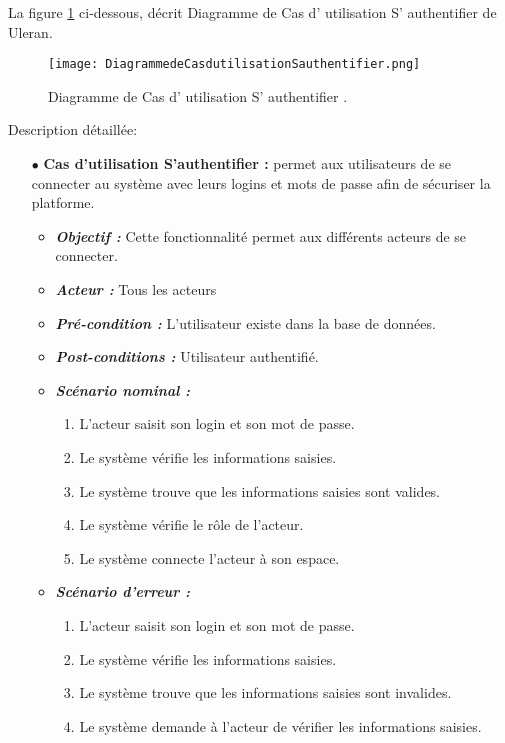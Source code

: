 La figure \ref{fig:Diagramme de Cas d utilisation S' authentifier } ci-dessous, décrit Diagramme de Cas d' utilisation S' authentifier
de Uleran.
\begin{figure}[ht]
	\centering
	\texttt{[image: DiagrammedeCasdutilisationSauthentifier.png]}
	\caption{Diagramme de Cas d' utilisation S' authentifier .}
\label{fig:Diagramme de Cas d utilisation S' authentifier }
\end{figure}
\FloatBarrier



{\Large \color{cyan} Description détaillée:}


\begin{itemize}
	
	\item[$\bullet$] \textbf{Cas d’utilisation S’authentifier :} permet aux utilisateurs de se connecter au système avec leurs logins et mots de passe afin de sécuriser la platforme.
	\medskip
	\begin{itemize}
		\item \textit{\textbf{Objectif :}}  Cette fonctionnalité permet aux différents acteurs de se connecter. 
		
		\item \textit{\textbf{Acteur :}} Tous les acteurs
		
		\item \textit{\textbf{Pré-condition  :}} L’utilisateur existe dans la base de données.
		\item \textit{\textbf{Post-conditions   :}} Utilisateur authentifié.
		\item \textit{\textbf{Scénario nominal :}}
		\begin{enumerate}
			\item L’acteur saisit son login et son mot de passe. 
			\item Le système vérifie les informations saisies. 
			\item Le système trouve que les informations saisies sont valides.  
			\item Le système vérifie le rôle de l’acteur.  
			\item Le système connecte l’acteur à son espace.
		\end{enumerate}
		\item \textit{\textbf{Scénario d'erreur :}} 
		\begin{enumerate}
			\item L’acteur saisit son login et son mot de passe. 
			\item Le système vérifie les informations saisies.   
			\item Le système trouve que les informations saisies sont invalides.  
			\item Le système demande à l’acteur de vérifier les informations saisies.
		\end{enumerate}
	\end{itemize}	
	\bigskip
\end{itemize}
\bigskip
